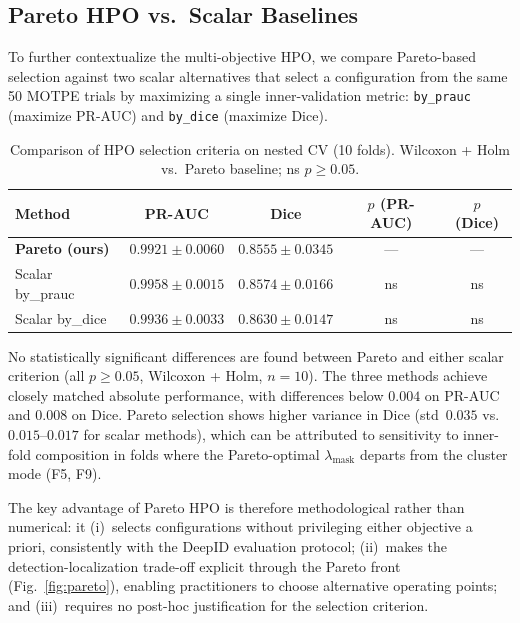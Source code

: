 \subsection{Pareto HPO vs.\ Scalar Baselines}
\label{subsec:scalar}

To further contextualize the multi-objective HPO, we compare Pareto-based
selection against two scalar alternatives that select a configuration from the
same 50 MOTPE trials by maximizing a single inner-validation metric:
\texttt{by\_prauc} (maximize PR-AUC) and \texttt{by\_dice} (maximize Dice).

\begin{table}[!t]
  \centering
  \caption{Comparison of HPO selection criteria on nested CV (10 folds).
           Wilcoxon + Holm vs.\ Pareto baseline; ns $p \geq 0.05$.}
  \label{tab:scalar}
  \begin{tabular}{lcccc}
    \toprule
    Method & PR-AUC & Dice & $p$ (PR-AUC) & $p$ (Dice) \\
    \midrule
    \textbf{Pareto (ours)} & $0.9921 \pm 0.0060$ & $0.8555 \pm 0.0345$ & — & — \\
    Scalar by\_prauc & $0.9958 \pm 0.0015$ & $0.8574 \pm 0.0166$ & ns & ns \\
    Scalar by\_dice  & $0.9936 \pm 0.0033$ & $0.8630 \pm 0.0147$ & ns & ns \\
    \bottomrule
  \end{tabular}
\end{table}

No statistically significant differences are found between Pareto and either scalar
criterion (all $p \geq 0.05$, Wilcoxon + Holm, $n = 10$). The three methods
achieve closely matched absolute performance, with differences below $0.004$ on
PR-AUC and $0.008$ on Dice. Pareto selection shows higher variance in Dice
(std~$0.035$ vs.\ $0.015$--$0.017$ for scalar methods), which can be attributed to
sensitivity to inner-fold composition in folds where the Pareto-optimal
$\lambda_{\text{mask}}$ departs from the cluster mode (F5, F9).

The key advantage of Pareto HPO is therefore methodological rather than numerical:
it (i)~selects configurations without privileging either objective a priori,
consistently with the DeepID evaluation protocol; (ii)~makes the detection-localization
trade-off explicit through the Pareto front (Fig.~\ref{fig:pareto}), enabling
practitioners to choose alternative operating points; and (iii)~requires no
post-hoc justification for the selection criterion.

